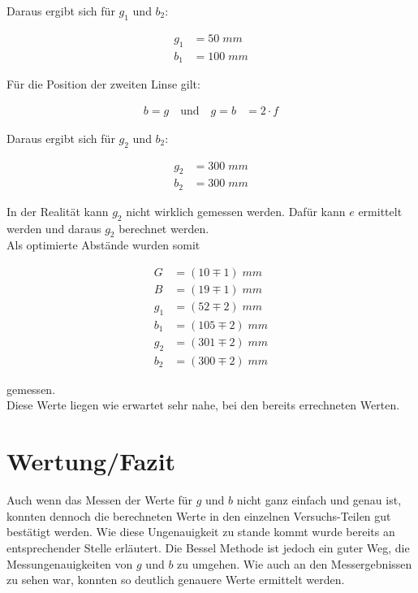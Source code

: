 \documentclass[a4paper]{scrartcl}
\numberwithin{equation}{subsection}
\begin{document}
Daraus ergibt sich für $g_1$ und $b_2$:

\begin{align*}
	g_1 &= 50 \;mm\\
	b_1 &= 100 \;mm
\end{align*}

Für die Position der zweiten Linse gilt:

\begin{align*}
b = g \quad \text{und} \quad g = b &= 2 \cdot f
\end{align*}

Daraus ergibt sich für $g_2$ und $b_2$:

\begin{align*}
	g_2 &= 300 \;mm\\
	b_2 &= 300 \;mm
\end{align*}

In der Realität kann $g_2$ nicht wirklich gemessen werden.
Dafür kann $e$ ermittelt werden und daraus $g_2$ berechnet werden. \\

Als optimierte Abstände wurden somit

\begin{align*}
	G &= (10 \mp 1) \;mm\\
	B &= (19 \mp 1) \;mm\\
	g_1 &= (52 \mp 2) \;mm\\
	b_1 &= (105 \mp 2) \;mm\\
	g_2 &= (301 \mp 2) \;mm\\
	b_2 &= (300 \mp 2) \;mm
\end{align*}

gemessen.\\

Diese Werte liegen wie erwartet sehr nahe, bei den bereits errechneten Werten.

\newpage
\section{Wertung/Fazit}

Auch wenn das Messen der Werte für $g$ und $b$ nicht ganz einfach und genau ist, konnten dennoch die berechneten Werte in den einzelnen Versuchs-Teilen gut bestätigt werden. Wie diese Ungenauigkeit zu stande kommt wurde bereits an entsprechender Stelle erläutert. Die Bessel Methode ist jedoch ein guter Weg, die Messungenauigkeiten von $g$ und $b$ zu umgehen. Wie auch an den Messergebnissen zu sehen war, konnten so deutlich genauere Werte ermittelt werden.
\end{document}
